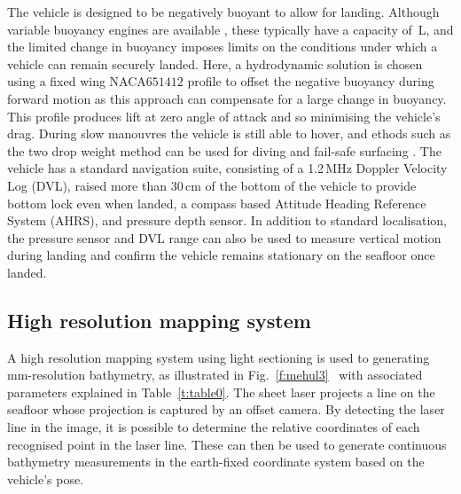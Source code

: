 The vehicle is designed to be negatively buoyant to allow for landing. Although variable buoyancy engines are available \cite{Zhao2008}, these typically have a capacity of \,L, and the limited change in buoyancy imposes limits on the conditions under which a vehicle can remain securely landed. Here, a hydrodynamic solution is chosen using a fixed wing NACA$651412$ profile to offset the negative buoyancy during forward motion as this approach can compensate for a large change in buoyancy. This profile produces lift at zero angle of attack and so minimising the vehicle's drag. During slow manouvres the vehicle is still able to hover, and ethods such as the two drop weight method can be used for diving and fail-safe surfacing \cite{Thornton2019}. The vehicle has a standard navigation suite, consisting of a 1.2\,MHz Doppler Velocity Log (DVL), raised more than 30\,cm of the bottom of the vehicle to provide bottom lock even when landed, a compass based Attitude Heading Reference System (AHRS), and pressure depth sensor. In addition to standard localisation, the pressure sensor and DVL range can also be used to measure vertical motion during landing and confirm the vehicle remains stationary on the seafloor once landed.

\subsection{High resolution mapping system}
\label{ssec:hres}

A high resolution mapping system using light sectioning is used to generating mm-resolution bathymetry, as illustrated in Fig.~\ref{f:mehul3}~\cite{Bodenmann2016} with associated parameters explained in Table~\ref{t:table0}. The sheet laser projects a line on the seafloor whose projection is captured by an offset camera. By detecting the laser line in the image, it is possible to determine the relative coordinates of each recognised point in the laser line. These can then be used to generate continuous bathymetry measurements in the earth-fixed coordinate system based on the vehicle's pose.

